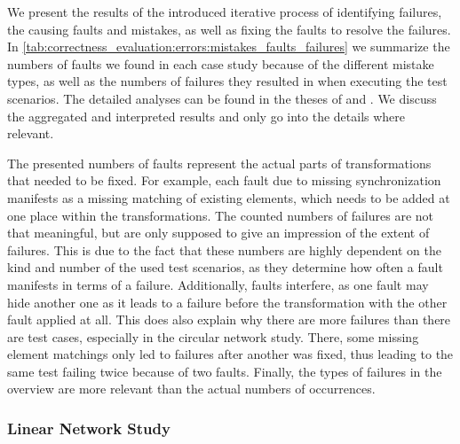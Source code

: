 We present the results of the introduced iterative process of identifying failures, the causing faults and mistakes, as well as fixing the faults to resolve the failures.
In \autoref{tab:correctness_evaluation:errors:mistakes_faults_failures} we summarize the numbers of faults we found in each case study because of the different mistake types, as well as the numbers of failures they resulted in when executing the test scenarios.
The detailed analyses can be found in the theses of \textcite{syma2018ma} and \textcite{saglam2020ma}.
We discuss the aggregated and interpreted results and only go into the details where relevant.

The presented numbers of faults represent the actual parts of transformations that needed to be fixed.
For example, each fault due to missing synchronization manifests as a missing matching of existing elements, which needs to be added at one place within the transformations.
The counted numbers of failures are not that meaningful, but are only supposed to give an impression of the extent of failures.
This is due to the fact that these numbers are highly dependent on the kind and number of the used test scenarios, as they determine how often a fault manifests in terms of a failure.
Additionally, faults interfere, as one fault may hide another one as it leads to a failure before the transformation with the other fault applied at all.
This does also explain why there are more failures than there are test cases, especially in the circular network study.
There, some missing element matchings only led to failures after another was fixed, thus leading to the same test failing twice because of two faults.
Finally, the types of failures in the overview are more relevant than the actual numbers of occurrences.

\subsubsection*{Linear Network Study} 


